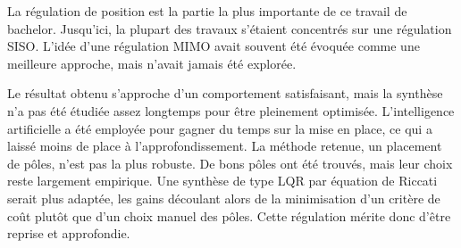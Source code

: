 La régulation de position est la partie la plus importante de ce travail de bachelor. Jusqu'ici, la plupart des travaux s'étaient concentrés sur une régulation SISO. L'idée d'une régulation MIMO avait souvent été évoquée comme une meilleure approche, mais n'avait jamais été explorée.

Le résultat obtenu s'approche d'un comportement satisfaisant, mais la synthèse n'a pas été étudiée assez longtemps pour être pleinement optimisée. L'intelligence artificielle a été employée pour gagner du temps sur la mise en place, ce qui a laissé moins de place à l'approfondissement. La méthode retenue, un placement de pôles, n'est pas la plus robuste. De bons pôles ont été trouvés, mais leur choix reste largement empirique. Une synthèse de type LQR par équation de Riccati \cite{Riccati} serait plus adaptée, les gains découlant alors de la minimisation d'un critère de coût plutôt que d'un choix manuel des pôles. Cette régulation mérite donc d'être reprise et approfondie.